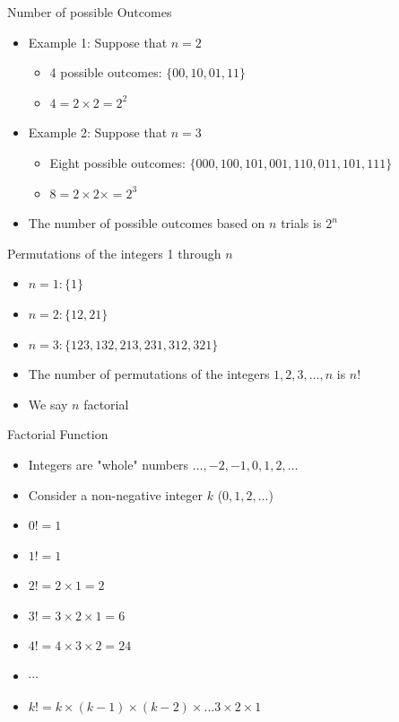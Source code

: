 \documentclass[xcolor=x11names,compress]{beamer}\usepackage[]{graphicx}\usepackage[]{color}
\begin{document}
\begin{frame}{Number of possible Outcomes}
  \begin{itemize}
  \item Example 1: Suppose that $n=2$
     \begin{itemize}
     \item 4 possible outcomes: $\{00,10,01,11\}$
     \item $4=2\times 2 = 2^2$
     \end{itemize}
   \item Example 2: Suppose that $n=3$
     \begin{itemize}
     \item Eight possible outcomes: $\{000,100,101,001,110,011,101,111\}$
     \item $8=2\times 2 \times = 2^3$
     \end{itemize}
   \item The number of possible outcomes based on $n$ trials is $2^n$
  \end{itemize}
\end{frame}


\begin{frame}{Permutations of the integers 1 through $n$}
  \begin{itemize}
  \item $n=1: \{1\}$
  \item $n=2: \{12,21\}$
  \item $n=3: \{123,132,213,231,312,321\}$
  \item The number of permutations of the integers $1,2,3,\ldots,n$ is $n!$
  \item We say $n$ factorial
  \end{itemize}
\end{frame}

\begin{frame}{Factorial Function}
  \begin{itemize}
  \item Integers are "whole" numbers $\ldots,-2,-1,0,1,2,\ldots$
  \item Consider a non-negative integer $k$ ($0,1,2,\ldots$)
  \item $0!=1$
  \item $1!=1$
  \item $2!=2\times 1 =2$
  \item $3!=3\times 2 \times 1 =6$
  \item $4!=4\times 3 \times 2 =24$
  \item $\cdots$
  \item $k!=k \times (k-1) \times (k-2) \times \ldots 3 \times 2 \times 1$
  \end{itemize}
\end{frame}
\end{document}
